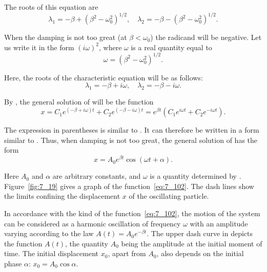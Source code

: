 \noindent
The roots of this equation are
\begin{equation}\label{eq:7_99}
	\lambda_1 = -\beta + \left(\beta^2 - \omega_0^2\right)^{1/2},\quad \lambda_2 = -\beta - \left(\beta^2 - \omega_0^2\right)^{1/2}.
\end{equation}

When the damping is not too great (at $\beta<\omega_0$) the radicand will be negative. Let us write it in the form $(i\omega)^2$, where $\omega$ is a real quantity equal to
\begin{equation}\label{eq:7_100}
	\omega = \left(\beta^2 - \omega_0^2\right)^{1/2}.
\end{equation}

\noindent
Here, the roots of the characteristic equation will be as follows:
\begin{equation}\label{eq:7_101}
	\lambda_1 = -\beta + i\omega,\quad \lambda_2 = -\beta - i\omega.
\end{equation}

By , the general solution of  will be the function
\begin{equation*}
	x = C_1e^{(-\beta + i\omega)t} + C_2e^{(-\beta - i\omega)t} = e^{\beta t} \left(C_1e^{i\omega t} + C_2e^{-i\omega t}\right).
\end{equation*}

\noindent
The expression in parentheses is similar to . It can therefore be written in a form similar to . Thus, when damping is not too great, the general solution of  has the form
\begin{equation}\label{eq:7_102}
	x = A_0 e^{\beta t} \cos(\omega t + \alpha).
\end{equation}

\noindent
Here $A_0$ and $\alpha$ are arbitrary constants, and $\omega$ is a quantity determined by . Figure~\ref{fig:7_19} gives a graph of the function~\eqref{eq:7_102}. The dash lines show the limits confining the displacement $x$ of the oscillating particle.

In accordance with the kind of the function~\eqref{eq:7_102}, the motion of the system can be considered as a harmonic oscillation of frequency $\omega$ with an amplitude varying according to the law $A(t)=A_0e^{-\beta t}$. The upper dash curve in  depicts the function $A(t)$, the quantity $A_0$ being the amplitude at the initial moment of time. The initial displacement $x_0$, apart from $A_0$, also depends on the initial phase $\alpha$: $x_0=A_0\cos\alpha$.

